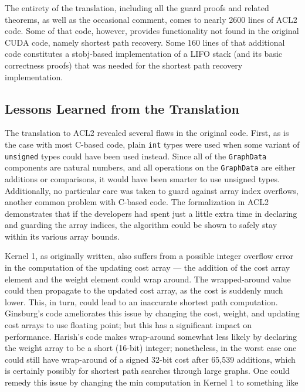 \documentclass[copyright]{eptcs}
\begin{document}
The entirety of the translation, including all the guard proofs and
related theorems, as well as the occasional comment, comes to nearly 
2600 lines of ACL2 code.  Some of that code, however, provides
functionality not found in the original CUDA code, namely shortest
path recovery.  Some 160 lines of that additional code constitutes 
a stobj-based implementation of a LIFO stack (and its basic 
correctness proofs) that was needed for the shortest path recovery 
implementation.

\subsection{Lessons Learned from the Translation}

The translation to ACL2 revealed several flaws in the original code.
First, as is the case with most C-based code, plain \texttt{int} types were
used when some variant of \texttt{unsigned} types could have been used 
instead.  Since all of the \texttt{GraphData} components are natural numbers, 
and all operations on the \texttt{GraphData} are either additions or 
comparisons, it would have been smarter to use unsigned types.
Additionally, no particular care was taken to guard against
array index overflows, another common problem with C-based code. 
The formalization in ACL2 demonstrates that if the developers had 
spent just a little extra time in declaring and guarding the array
indices, the algorithm could be shown to safely stay within its
various array bounds.

Kernel 1, as originally written, also suffers from a possible integer 
overflow error in the computation of the updating cost array --- 
the addition of the cost array element and the weight element 
could wrap around.  The wrapped-around value could then 
propagate to the updated cost array, as the cost is suddenly 
much lower.  This, in turn, could lead to an inaccurate shortest 
path computation.  Ginsburg's code 
\cite{Ginsburg2011} ameliorates this issue by changing the cost,
weight, and updating cost arrays to use floating point; but this has a
significant impact on performance.  Harish's code
\cite{HarishWeb} makes wrap-around somewhat less likely by declaring
the weight array to be a short (16-bit) integer; nonetheless, in the
worst case one could still have wrap-around of a signed 32-bit cost after 
65,539 additions, which is certainly possibly for shortest path
searches through large graphs.  One could remedy this issue by
changing the min computation in Kernel 1 to something like
\end{document}
